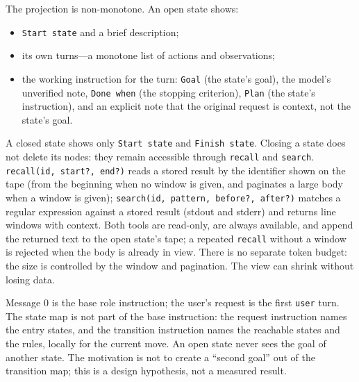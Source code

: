 \documentclass[11pt,a4paper]{article}
\begin{document}
The projection is non-monotone. An open state shows:
\begin{itemize}[leftmargin=1.4em,itemsep=0.15em]
  \item \texttt{Start state} and a brief description;
  \item its own turns---a monotone list of actions and observations;
  \item the working instruction for the turn: \texttt{Goal} (the state's goal), the model's
  unverified note, \texttt{Done when} (the stopping criterion), \texttt{Plan} (the state's
  instruction), and an explicit note that the original request is context, not the state's goal.
\end{itemize}
A closed state shows only \texttt{Start state} and \texttt{Finish state}. Closing a state does
not delete its nodes: they remain accessible through \texttt{recall} and \texttt{search}.
\texttt{recall(id, start?, end?)} reads a stored result by the identifier shown on the tape
(from the beginning when no window is given, and paginates a large body when a window is given);
\texttt{search(id, pattern, before?, after?)} matches a regular expression against a stored
result (stdout and stderr) and returns line windows with context. Both tools are read-only, are
always available, and append the returned text to the open state's tape; a repeated
\texttt{recall} without a window is rejected when the body is already in view. There is no
separate token budget: the size is controlled by the window and pagination. The view can shrink
without losing data.

Message 0 is the base role instruction; the user's request is the first \texttt{user} turn. The
state map is not part of the base instruction: the request instruction names the entry
states, and the transition instruction names the reachable states and the rules, locally for the
current move. An open state never sees the goal of another state. The motivation is not to
create a ``second goal'' out of the transition map; this is a design hypothesis, not a measured
result.
\end{document}
